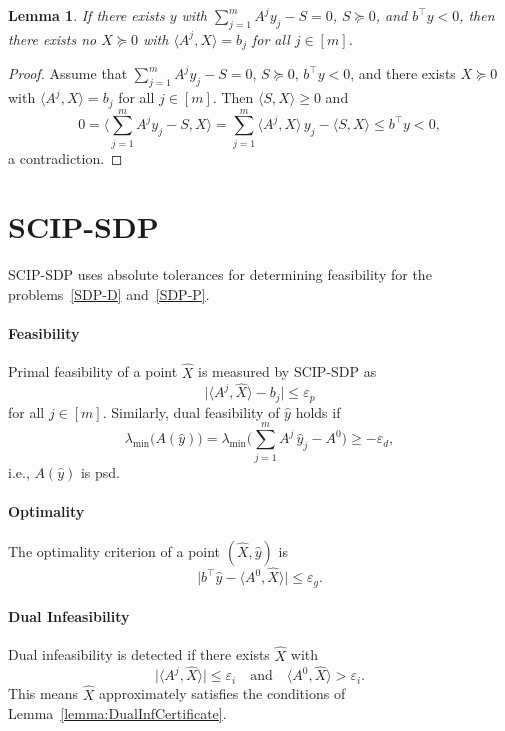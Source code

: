 \documentclass[10pt, a4paper]{article}
\newcommand{\abs}[1]{\lvert{#1}\rvert}
\newcommand{\skal}[2]{\langle{#1},{#2}\rangle}
\newcommand{\T}{^{\top}}
\newtheorem{lemma}[theorem]{Lemma}
\begin{document}
\begin{lemma}\label{lemma:PrimalInfCertificate2}
  If there exists $y$ with $\sum_{j=1}^m A^j y_j - S = 0$, $S \succeq 0$,
  and $b\T y < 0$, then there exists no $X \succeq 0$ with
  $\skal{A^j}{X} = b_j$ for all $j \in [m]$.
\end{lemma}

\begin{proof}
  Assume that $\sum_{j=1}^m A^j y_j - S = 0$, $S \succeq 0$, $b\T y < 0$,
  and there exists $X \succeq 0$ with $\skal{A^j}{X} = b_j$ for all
  $j \in [m]$. Then $\skal{S}{X} \geq 0$ and
  \[
  0 = \skal{\sum_{j=1}^m A^j y_j - S}{X} = \sum_{j=1}^m \skal{A^j}{X}\, y_j
  - \skal{S}{X} \leq b\T y < 0,
  \]
  a contradiction.
\end{proof}

\section{SCIP-SDP}

SCIP-SDP uses absolute tolerances for determining feasibility for the
problems~\eqref{SDP-D} and~\eqref{SDP-P}.

\paragraph{Feasibility}

Primal feasibility of a point $\hat{X}$ is measured by SCIP-SDP as
\[
\abs{\skal{A^j}{\hat{X}} - b_j} \leq \varepsilon_p
\]
for all $j \in [m]$. Similarly, dual feasibility of $\hat{y}$ holds if
\[
\lambda_{\min}\big(A(\hat{y})\big) = \lambda_{\min}\Big(\sum_{j=1}^m A^j\, \hat{y}_j -
A^0\Big) \geq - \varepsilon_d,
\]
i.e., $A(\hat{y})$ is psd.


\paragraph{Optimality}

The optimality criterion of a point $(\hat{X}, \hat{y})$ is
\[
\abs{b\T \hat{y} - \skal{A^0}{\hat{X}}} \leq \varepsilon_g.
\]

\paragraph{Dual Infeasibility}

Dual infeasibility is detected if there exists $\hat{X}$ with
\[
\abs{\skal{A^j}{\hat{X}}} \leq \varepsilon_i \quad\text{and}\quad
\skal{A^0}{\hat{X}} > \varepsilon_i.
\]
This means $\hat{X}$ approximately satisfies the conditions of
Lemma~\ref{lemma:DualInfCertificate}.
\end{document}
